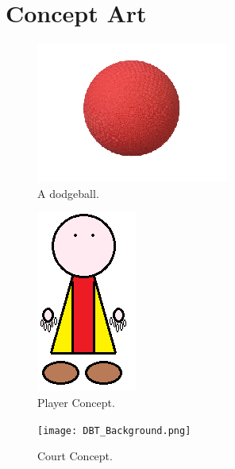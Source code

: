 \documentclass [12pt]{article}
\begin{document}
\section*{Concept Art}

\begin{figure}[!htb]
	\includegraphics{dodgeball.png}
	\caption{A dodgeball.}
\end{figure}

\begin{figure}[!htb]
	\includegraphics{player.png}
	\caption{Player Concept.}
\end{figure}

\begin{figure}[!htb]
	\texttt{[image: DBT\_Background.png]}
	\caption{Court Concept.}
\end{figure}
\end{document}
